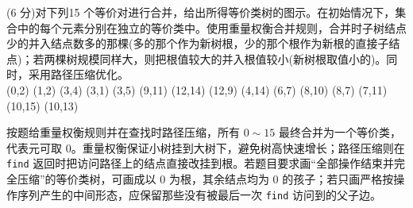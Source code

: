 \begin{question}
(6 分)对下列15 个等价对进行合并，给出所得等价类树的图示。在初始情况下，集合中的每个元素分别在独立的等价类中。使用重量权衡合并规则，合并时子树结点少的并入结点数多的那棵(多的那个作为新树根，少的那个根作为新根的直接子结点)；若两棵树规模同样大，则把根值较大的并入根值较小(新树根取值小的)。同时，采用路径压缩优化。\\
(0,2) (1,2) (3,4) (3,1) (3,5) (9,11) (12,14) (12,9) (4,14) (6,7) (8,10) (8,7) (7,11) (10,15) (10,13)
\begin{solution}
按题给重量权衡规则并在查找时路径压缩，所有 $0\sim15$ 最终合并为一个等价类，代表元可取 $0$。重量权衡保证小树挂到大树下，避免树高快速增长；路径压缩则在 \texttt{find} 返回时把访问路径上的结点直接改挂到根。若题目要求画“全部操作结束并完全压缩”的等价类树，可画成以 $0$ 为根，其余结点均为 $0$ 的孩子；若只画严格按操作序列产生的中间形态，应保留那些没有被最后一次 \texttt{find} 访问到的父子边。
\end{solution}
\end{question}

